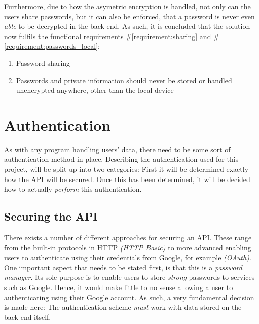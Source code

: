 			Furthermore, due to how the asymetric encryption is handled, not only can the users share passwords, but it can also be enforced, that a password is never even \emph{able} to be decrypted in the back-end. As such, it is concluded that the solution now fulfils the functional requirements \#\ref{requirement:sharing} and \#\ref{requirement:passwords_local}:
			\vspace{-3ex}\begin{enumerate}
				\setlength\itemsep{0.1em}
				\setcounter{enumi}{5-1}
				\item Password sharing
				\setcounter{enumi}{9-1}
				\item Passwords and private information should never be stored or handled unencrypted anywhere, other than the local device
			\end{enumerate}




	\section{Authentication}
		As with any program handling users' data, there need to be some sort of authentication method in place. Describing the authentication used for this project, will be split up into two categories: First it will be determined exactly how the API will be secured. Once this has been determined, it will be decided how to actually \emph{perform} this authentication.

		\subsection{Securing the API}
			There exists a number of different approaches for securing an API. These range from the built-in protocols in HTTP \emph{(HTTP Basic)} to more advanced enabling users to authenticate using their credentials from Google, for example \emph{(OAuth)}. One important aspect that needs to be stated first, is that this is a \emph{password manager}. Its sole purpose is to enable users to store \emph{strong} passwords to services such as Google. Hence, it would make little to no sense allowing a user to authenticating using their Google account. As such, a very fundamental decision is made here: The authentication scheme \emph{must} work with data stored on the back-end itself.

